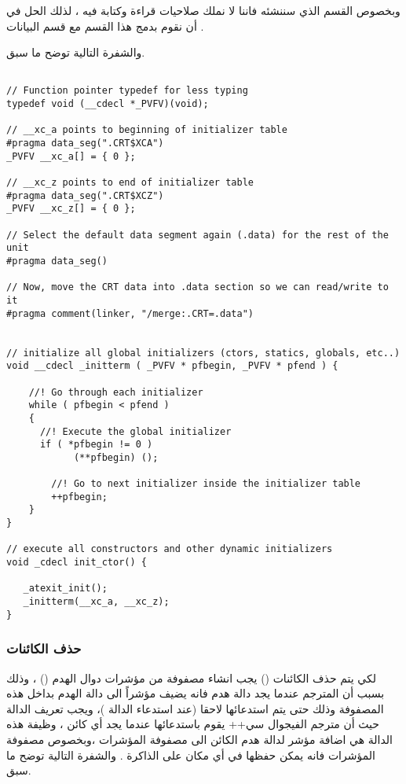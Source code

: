 \documentclass[document.tex]{subfiles}
\begin{document}
وبخصوص القسم  الذي سننشئه فاننا لا نملك صلاحيات قراءة وكتابة فيه ، لذلك الحل في أن نقوم بدمج هذا القسم مع قسم البيانات  .

والشفرة التالية توضح ما سبق.
 
\begin{english}

\lstset{numberstyle=\tiny,numbersep=5pt,tabsize=2,extendedchars=true,breaklines=true,frame=b,showspaces=false, showtabs=false,xleftmargin=10pt,framexleftmargin=10pt,framexrightmargin=5pt,framexbottommargin=4pt,showstringspaces=false,language=C++}

\begin{lstlisting}[label=newdelete,caption=Global new/delete operator]

// Function pointer typedef for less typing
typedef void (__cdecl *_PVFV)(void);

// __xc_a points to beginning of initializer table
#pragma data_seg(".CRT$XCA")
_PVFV __xc_a[] = { 0 };

// __xc_z points to end of initializer table
#pragma data_seg(".CRT$XCZ")
_PVFV __xc_z[] = { 0 };

// Select the default data segment again (.data) for the rest of the unit
#pragma data_seg()

// Now, move the CRT data into .data section so we can read/write to it
#pragma comment(linker, "/merge:.CRT=.data")


// initialize all global initializers (ctors, statics, globals, etc..)
void __cdecl _initterm ( _PVFV * pfbegin, _PVFV * pfend ) {

	//! Go through each initializer
    while ( pfbegin < pfend )
    {
	  //! Execute the global initializer
      if ( *pfbegin != 0 )
            (**pfbegin) ();

	    //! Go to next initializer inside the initializer table
        ++pfbegin;
    }
}

// execute all constructors and other dynamic initializers
void _cdecl init_ctor() {

   _atexit_init();
   _initterm(__xc_a, __xc_z); 
}

\end{lstlisting}
\end{english}

\subsubsection{حذف الكائنات}
لكي يتم حذف الكائنات () يجب انشاء مصفوفة من مؤشرات دوال الهدم () ، وذلك بسبب أن المترجم عندما يجد دالة هدم فانه يضيف مؤشراً الى دالة الهدم بداخل هذه المصفوفة وذلك حتى يتم استدعائها لاحقا (عند استدعاء الدالة )، ويجب تعريف الدالة  حيث أن مترجم الفيجوال سي++ يقوم باستدعائها عندما يجد أي كائن ، وظيفة هذه الدالة هي اضافة مؤشر لدالة هدم الكائن الى مصفوفة المؤشرات ،وبخصوص مصفوفة المؤشرات فانه يمكن حفظها في أي مكان على الذاكرة . والشفرة التالية توضح ما سبق.
\end{document}
